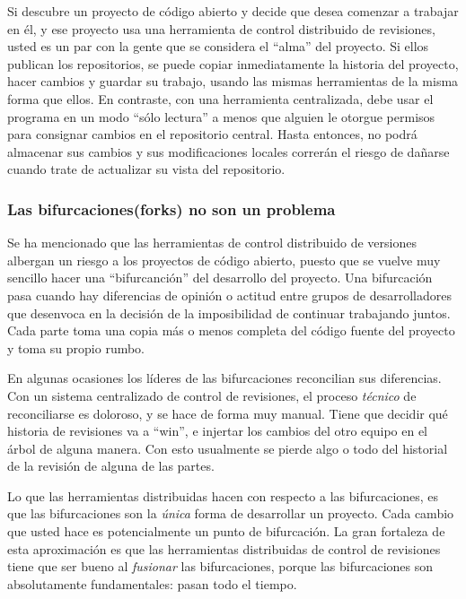 Si descubre un proyecto de código abierto y decide que desea comenzar
a trabajar en él, y ese proyecto usa una herramienta de control
distribuido de revisiones, usted es un par con la gente que se
considera el ``alma'' del proyecto.  Si ellos publican los
repositorios, se puede copiar inmediatamente la historia del proyecto,
hacer cambios y guardar su trabajo, usando las mismas herramientas de
la misma forma que ellos. En contraste, con una herramienta
centralizada, debe usar el programa en un modo ``sólo lectura'' a
menos que alguien le otorgue permisos para consignar cambios en el
repositorio central. Hasta entonces, no podrá almacenar sus cambios y
sus modificaciones locales correrán el riesgo de dañarse cuando trate
de actualizar su vista del repositorio.

\subsubsection{Las bifurcaciones(forks) no son un problema}

Se ha mencionado que las herramientas de control distribuido de
versiones albergan un riesgo a los proyectos de código abierto, puesto
que se vuelve muy sencillo hacer una ``bifurcanción'' del
desarrollo del proyecto.  Una bifurcación pasa cuando hay diferencias
de opinión o actitud entre grupos de desarrolladores que desenvoca en
la decisión de la imposibilidad de continuar trabajando juntos. Cada
parte toma una copia más o menos completa del código fuente del
proyecto y toma su propio rumbo.

En algunas ocasiones los líderes de las bifurcaciones reconcilian sus
diferencias. Con un sistema centralizado de control de revisiones, el
proceso \emph{técnico} de reconciliarse es doloroso, y se hace de
forma muy manual.  Tiene que decidir qué historia de revisiones va a
``win'', e injertar los cambios del otro equipo en el árbol de alguna
manera. Con esto usualmente se pierde algo o todo del historial de la
revisión de alguna de las partes.

Lo que las herramientas distribuidas hacen con respecto a las
bifurcaciones, es que las bifurcaciones son la \emph{única} forma de
desarrollar un proyecto. Cada cambio que usted hace es potencialmente
un punto de bifurcación. La gran fortaleza de esta aproximación es que
las herramientas distribuidas de control de revisiones tiene que ser
bueno al \emph{fusionar} las bifurcaciones, porque las bifurcaciones
son absolutamente fundamentales: pasan todo el tiempo.

